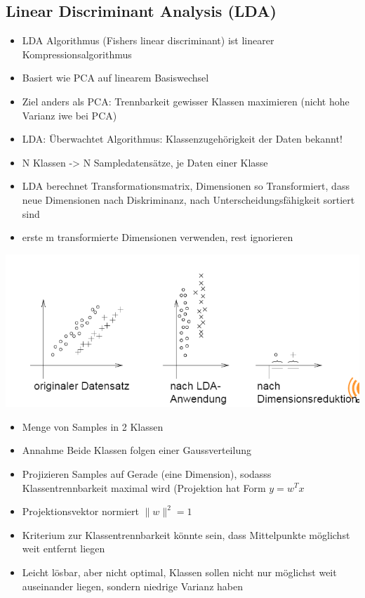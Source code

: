 \documentclass[a4paper,10pt,oneside]{article}
\begin{document}
\subsection{Linear Discriminant Analysis (LDA)}
\begin{itemize}
	\item LDA Algorithmus (Fishers linear discriminant) ist linearer Kompressionsalgorithmus
	\item Basiert wie PCA auf linearem Basiswechsel
	\item Ziel anders als PCA: Trennbarkeit gewisser Klassen maximieren (nicht hohe Varianz iwe bei PCA)
	\item LDA: Überwachtet Algorithmus: Klassenzugehörigkeit der Daten bekannt!
	\item N Klassen -> N Sampledatensätze, je Daten einer Klasse
	\item LDA berechnet Transformationsmatrix, Dimensionen so Transformiert, dass neue Dimensionen nach Diskriminanz, nach Unterscheidungsfähigkeit sortiert sind
	\item erste m transformierte Dimensionen verwenden, rest ignorieren
\end{itemize}

\includegraphics[scale=0.65]{Grafiken/lda.png}

\begin{itemize}
	\item Menge von Samples in 2 Klassen
	\item Annahme Beide Klassen folgen einer Gaussverteilung
	\item Projizieren Samples auf Gerade (eine Dimension), sodasss Klassentrennbarkeit maximal wird (Projektion hat Form $y=w^Tx$
	\item Projektionsvektor normiert $\|w\|^2= 1$
	\item Kriterium zur Klassentrennbarkeit könnte sein, dass Mittelpunkte möglichst weit entfernt liegen
	\item Leicht lösbar, aber nicht optimal, Klassen sollen nicht nur möglichst weit auseinander liegen, sondern niedrige Varianz haben
\end{itemize}
\end{document}
